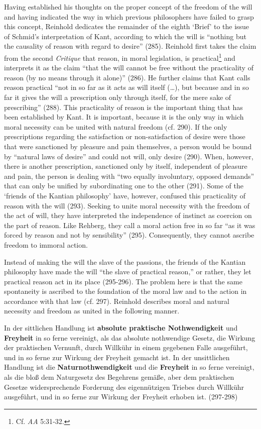 Having established his thoughts on the proper concept of the freedom of the will and having indicated the way in which previous philosophers have failed to grasp this concept, Reinhold dedicates the remainder of the eighth `Brief' to the issue of Schmid's interpretation of Kant, according to which the will is ``nothing but the causality of reason with regard to desire'' (285). Reinhold first takes the claim from the second \textit{Critique} that reason, in moral legislation, is practical\footnote{ Cf. \textit{AA} 5:31{-}32.} and interprets it as the claim ``that the will cannot be free without the practicality of reason (by no means through it alone)'' (286). He further claims that Kant calls reason practical ``not in so far as it acts as will itself (\ldots ), but because and in so far it gives the will a prescription only through itself, for the mere sake of prescribing'' (288). This practicality of reason is the important thing that has been established by Kant. It is important, because it is the only way in which moral necessity can be united with natural freedom (cf. 290). If the only prescriptions regarding the satisfaction or non{-}satisfaction of desire were those that were sanctioned by pleasure and pain themselves, a person would be bound by ``natural laws of desire'' and could not will, only desire (290). When, however, there is another prescription, sanctioned only by itself, independent of pleasure and pain, the person is dealing with ``two equally involuntary, opposed demands'' that can only be unified by subordinating one to the other (291). Some of the `friends of the Kantian philosophy' have, however, confused this practicality of reason with the will (293). Seeking to unite moral necessity with the freedom of the act of will, they have interpreted the independence of instinct as coercion on the part of reason. Like Rehberg, they call a moral action free in so far ``as it was forced by reason and not by sensibility'' (295). Consequently, they cannot ascribe freedom to immoral action. 

 Instead of making the will the slave of the passions, the friends of the Kantian philosophy have made the will ``the slave of practical reason,'' or rather, they let practical reason act in its place (295{-}296). The problem here is that the same spontaneity is ascribed to the foundation of the moral law and to the action in accordance with that law (cf. 297). Reinhold describes moral and natural necessity and freedom as united in the following manner. 

In der sittlichen Handlung ist \textbf{absolute praktische Nothwendigkeit} und \textbf{Freyheit} in so ferne vereinigt, als das absolute nothwendige Gesetz, die Wirkung der praktischen Vernunft, durch Willk\"{u}hr in einem gegebenen Falle ausgef\"{u}hrt, und in so ferne zur Wirkung der Freyheit gemacht ist. In der unsittlichen Handlung ist die \textbf{Naturnothwendigkeit} und die \textbf{Freyheit} in so ferne vereinigt, als die blo\ss{} dem Naturgesetz des Begehrens gem\"{a}\ss{}e, aber dem praktischen Gesetze widersprechende Forderung des eigenn\"{u}tzigen Triebes durch Willk\"{u}hr ausgef\"{u}hrt, und in so ferne zur Wirkung der Freyheit erhoben ist. (297{-}298)

